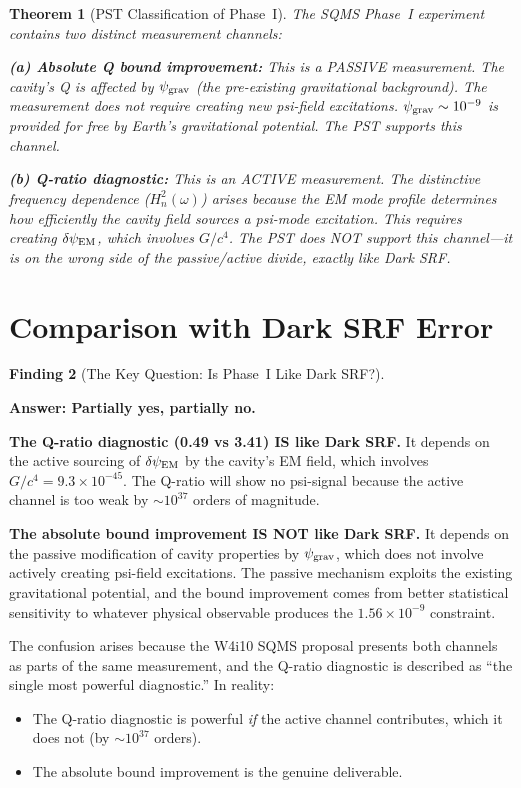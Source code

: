 \documentclass[11pt]{article}
\newcommand{\ee}[1]{\times 10^{#1}}
\newcommand{\Heff}{H_n}
\newcommand{\psigrav}{\psi_{\rm grav}}
\newcommand{\dpsiEM}{\delta\psi_{\rm EM}}
\newtheorem{theorem}{Theorem}[section]
\theoremstyle{definition}
\newtheorem{finding}[theorem]{Finding}
\theoremstyle{remark}
\begin{document}
\begin{theorem}[PST Classification of Phase~I]
\label{thm:pst}
The SQMS Phase~I experiment contains two distinct measurement channels:

\textbf{(a) Absolute Q bound improvement:} This is a PASSIVE measurement.
The cavity's Q is affected by $\psigrav$ (the pre-existing gravitational
background). The measurement does not require creating new psi-field
excitations. $\psigrav \sim 10^{-9}$ is provided for free by Earth's
gravitational potential. The PST supports this channel.

\textbf{(b) Q-ratio diagnostic:} This is an ACTIVE measurement. The
distinctive frequency dependence ($\Heff^2(\omega)$) arises because the
EM mode profile determines how efficiently the cavity field sources a
psi-mode excitation. This requires creating $\dpsiEM$, which involves
$G/c^4$. The PST does NOT support this channel---it is on the wrong
side of the passive/active divide, exactly like Dark SRF.
\end{theorem}


\section{Comparison with Dark SRF Error}
\label{sec:darksrf_comparison}

\begin{finding}[The Key Question: Is Phase~I Like Dark SRF?]
\label{find:key_question}

\textbf{Answer: Partially yes, partially no.}

\textbf{The Q-ratio diagnostic (0.49 vs 3.41) IS like Dark SRF.}
It depends on the active sourcing of $\dpsiEM$ by the cavity's EM
field, which involves $G/c^4 = 9.3\ee{-45}$. The Q-ratio will show
no psi-signal because the active channel is too weak by $\sim 10^{37}$
orders of magnitude.

\textbf{The absolute bound improvement IS NOT like Dark SRF.}
It depends on the passive modification of cavity properties by
$\psigrav$, which does not involve actively creating psi-field
excitations. The passive mechanism exploits the existing gravitational
potential, and the bound improvement comes from better statistical
sensitivity to whatever physical observable produces the $1.56\ee{-9}$
constraint.

The confusion arises because the W4i10 SQMS proposal presents both
channels as parts of the same measurement, and the Q-ratio diagnostic
is described as ``the single most powerful diagnostic.'' In reality:
\begin{itemize}[nosep]
\item The Q-ratio diagnostic is powerful \emph{if} the active channel
  contributes, which it does not (by $\sim 10^{37}$ orders).
\item The absolute bound improvement is the genuine deliverable.
\end{itemize}
\end{finding}
\end{document}
